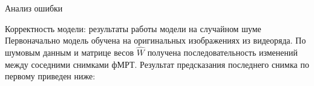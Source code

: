 \documentclass[9pt,pdf]{beamer} %
\begin{document}
\begin{frame}{Анализ ошибки}
\begin{block}{Корректность модели: результаты работы модели на случайном шуме}
Первоначально модель обучена на оригинальных изображениях из видеоряда. По шумовым данным и матрице весов $\hat{W}$ получена последовательность изменений между соседними снимками фМРТ. Результат предсказания последнего снимка по первому приведен ниже:
\begin{figure}[h!]
    \centering
    \hfill
    \hfill
    \label{fig:8}
\end{figure}
\end{block}
\end{frame}
\end{document}
